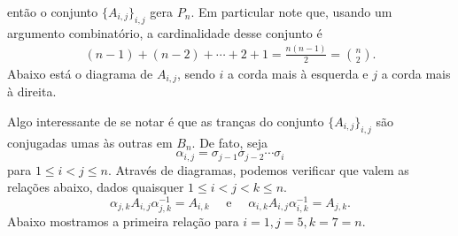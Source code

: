 	então o conjunto $\{ A_{i,j} \}_{i,j}$ gera $P_n$. Em particular note que, usando um 
	argumento combinatório, a cardinalidade desse conjunto é
	\begin{align*}
	    (n-1) + (n-2) + \cdots + 2 + 1 = \frac{n(n-1)}{2} = \binom{n}{2}.
	\end{align*}
	Abaixo está o diagrama de $A_{i,j}$, sendo $i$ a corda mais à esquerda e $j$ a corda mais à direita.
	\begin{center}
	\end{center}
	Algo interessante de se notar é que as tranças do conjunto $\{A_{i,j}\}_{i,j}$ são conjugadas umas às outras em $B_n$. De fato, seja
	\[\alpha_{i,j} = \sigma_{j-1}\sigma_{j-2}\cdots\sigma_i
	\]
	para $1\leq i<j\leq n$. Através de diagramas, podemos verificar que valem as relações abaixo, dados quaisquer $1\leq i<j<k\leq n$.
	\begin{equation*}
	    \alpha_{j,k}A_{i,j}\alpha_{j,k}^{-1} = A_{i,k} 
	    \quad\text{ e }\quad 
	    \alpha_{i,k}A_{i,j}\alpha_{i,k}^{-1} = A_{j,k}.
	\end{equation*}
	Abaixo mostramos a primeira relação para $i=1, j=5, k=7=n$.
	\begin{center}
	\end{center}
